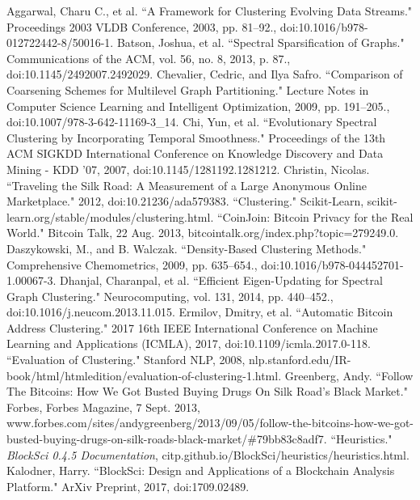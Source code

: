\documentclass[journal]{IEEEtran}
\begin{document}
\newpage
\begin{thebibliography}{1}
 Aggarwal, Charu C., et al. ``A Framework for Clustering Evolving Data Streams." Proceedings 2003 VLDB Conference, 2003, pp. 81–92., doi:10.1016/b978-012722442-8/50016-1.
 Batson, Joshua, et al. ``Spectral Sparsification of Graphs." Communications of the ACM, vol. 56, no. 8, 2013, p. 87., doi:10.1145/2492007.2492029.
 Chevalier, Cedric, and Ilya Safro. ``Comparison of Coarsening Schemes for Multilevel Graph Partitioning." Lecture Notes in Computer Science Learning and Intelligent Optimization, 2009, pp. 191–205., doi:10.1007/978-3-642-11169-3\_14.
 Chi, Yun, et al. ``Evolutionary Spectral Clustering by Incorporating Temporal Smoothness." Proceedings of the 13th ACM SIGKDD International Conference on Knowledge Discovery and Data Mining - KDD '07, 2007, doi:10.1145/1281192.1281212.
 Christin, Nicolas. ``Traveling the Silk Road: A Measurement of a Large Anonymous Online Marketplace." 2012, doi:10.21236/ada579383.
 ``Clustering." Scikit-Learn, scikit-learn.org/stable/modules/clustering.html.
 ``CoinJoin: Bitcoin Privacy for the Real World." Bitcoin Talk, 22 Aug. 2013, bitcointalk.org/index.php?topic=279249.0.
 Daszykowski, M., and B. Walczak. ``Density-Based Clustering Methods." Comprehensive Chemometrics, 2009, pp. 635–654., doi:10.1016/b978-044452701-1.00067-3.
 Dhanjal, Charanpal, et al. ``Efficient Eigen-Updating for Spectral Graph Clustering." Neurocomputing, vol. 131, 2014, pp. 440–452., doi:10.1016/j.neucom.2013.11.015.
 Ermilov, Dmitry, et al. ``Automatic Bitcoin Address Clustering." 2017 16th IEEE International Conference on Machine Learning and Applications (ICMLA), 2017, doi:10.1109/icmla.2017.0-118.
 ``Evaluation of Clustering." Stanford NLP, 2008, nlp.stanford.edu/IR-book/html/htmledition/evaluation-of-clustering-1.html.
 Greenberg, Andy. ``Follow The Bitcoins: How We Got Busted Buying Drugs On Silk Road's Black Market." Forbes, Forbes Magazine, 7 Sept. 2013, www.forbes.com/sites/andygreenberg/2013/09/05/follow-the-bitcoins-how-we-got-busted-buying-drugs-on-silk-roads-black-market/\#79bb83c8adf7.
 ``Heuristics." \textit{BlockSci 0.4.5 Documentation}, citp.github.io/BlockSci/heuristics/heuristics.html. 
 Kalodner, Harry. ``BlockSci: Design and Applications of a Blockchain Analysis Platform." ArXiv Preprint, 2017, doi:1709.02489.

\end{thebibliography}
\end{document}
